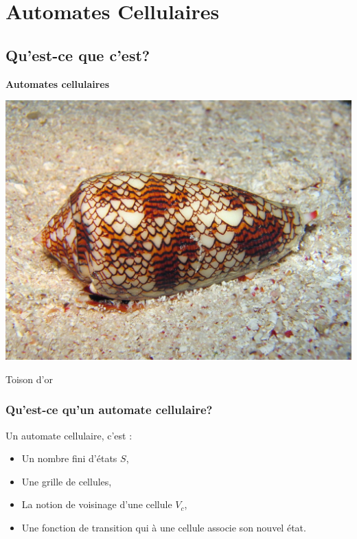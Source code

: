 \documentclass{beamer}
\begin{document}
\section{Automates Cellulaires}

\subsection{Qu'est-ce que c'est?}

\begin{frame}
\begin{center}
\textbf{Automates cellulaires}
\end{center}

\begin{center}
\includegraphics[scale=0.16]{textile_cone.jpg}
\end{center}

\begin{center}Toison d'or\end{center}

\end{frame}


\begin{frame}
\frametitle{Qu'est-ce qu'un automate cellulaire?}
\begin{block}{Un automate cellulaire, c'est :}
	\begin{itemize}
		\item Un nombre fini d'états $S$,
		\item Une grille de cellules,
		\item La notion de voisinage d'une cellule $V_c$,
		\item Une fonction de transition qui à une cellule associe son nouvel état.
	\end{itemize}
\end{block}
\end{frame}
\end{document}
